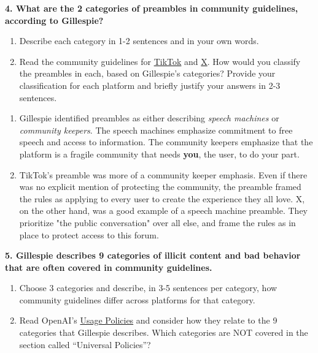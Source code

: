 \documentclass{article}
\begin{document}
\textbf{4. What are the 2 categories of preambles in community guidelines, according to Gillespie?}
\begin{enumerate}[label=\Alph*.]
\item Describe each category in 1-2 sentences and in your own words. 
\item Read the community guidelines for \href{https://www.tiktok.com/community-guidelines/en?lang=en}{TikTok} and \href{https://help.x.com/en/rules-and-policies/x-rules}{X}. How would you classify the preambles in each, based on Gillespie's categories? Provide your classification for each platform and briefly justify your answers in 2-3 sentences.
\end{enumerate}

\bigskip

\begin{mdframed}
\begin{enumerate}[label=\Alph*.]
    \item Gillespie identified preambles as either describing \textit{speech machines} or \textit{community keepers}. The speech machines emphasize commitment to free speech and access to information. The community keepers emphasize that the platform is a fragile community that needs \textbf{you}, the user, to do your part. 
    \item TikTok's preamble was more of a community keeper emphasis. Even if there was no explicit mention of protecting the community, the preamble framed the rules as applying to every user to create the experience they all love. X, on the other hand, was a good example of a speech machine preamble. They prioritize "the public conversation" over all else, and frame the rules as in place to protect access to this forum. 
\end{enumerate}
\end{mdframed}
\bigskip

\textbf{5. Gillespie describes 9 categories of illicit content and bad behavior that are often covered in community guidelines.}
\begin{enumerate}[label=\Alph*.]
    \item Choose 3 categories and describe, in 3-5 sentences per category, how community guidelines differ across platforms for that category.
    \item Read OpenAI's \href{https://openai.com/policies/usage-policies/}{Usage Policies} and consider how they relate to the 9 categories that Gillespie describes. Which categories are NOT covered in the section called ``Universal Policies''?
\end{enumerate}
\end{document}
